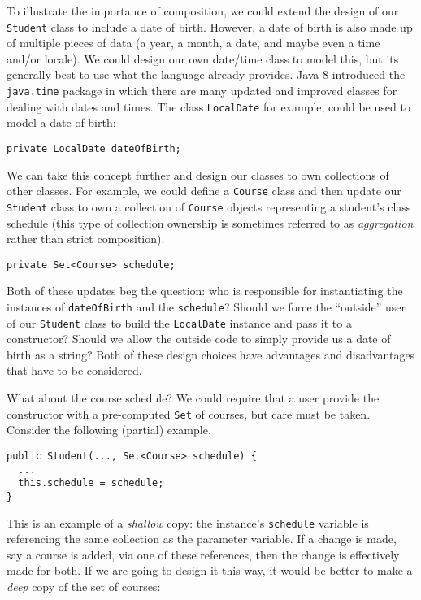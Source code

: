 To illustrate the importance of composition, we could extend the 
design of our \texttt{Student} class to include a date of 
birth.  However, a date of birth is also made up of multiple pieces
of data (a year, a month, a date, and maybe even a time and/or locale).
We could design our own date/time class to model this, but its generally
best to use what the language already provides.  Java 8 introduced the
\texttt{java.time} package in which there are many updated
and improved classes for dealing with dates and times.  The class
\texttt{LocalDate} for example, could be used to model a
date of birth:

\begin{verbatim}
private LocalDate dateOfBirth;
\end{verbatim}

We can take this concept further and design our classes to own 
collections of other classes.  For example, we could define a 
\texttt{Course} class and then update our \texttt{Student} class to own a collection of \texttt{Course}
objects representing a student's class schedule (this type of
collection ownership is sometimes referred to as \emph{aggregation}
rather than strict composition).

\begin{verbatim}
private Set<Course> schedule;
\end{verbatim}

Both of these updates beg the question: who is responsible for instantiating
the instances of \texttt{dateOfBirth} and the 
\texttt{schedule}?  Should we force the ``outside'' user
of our \texttt{Student} class to build the 
\texttt{LocalDate} instance and pass it to a constructor?
Should we allow the outside code to simply provide us a date of birth
as a string?  Both of these design choices have advantages
and disadvantages that have to be considered.

What about the course schedule?  We could require that a user
provide the constructor with a pre-computed \texttt{Set}
of courses, but care must be taken.  Consider the following
(partial) example.

\begin{verbatim}
public Student(..., Set<Course> schedule) {
  ...
  this.schedule = schedule;
}
\end{verbatim}

This is an example of a \emph{shallow} copy: the instance's
\texttt{schedule} variable is referencing the same collection
as the parameter variable.  If a change is made, say a course is
added, via one of these references, then the change is effectively
made for both.  If we are going to design it this way, it would
be better to make a \emph{deep} copy of the set of courses:

